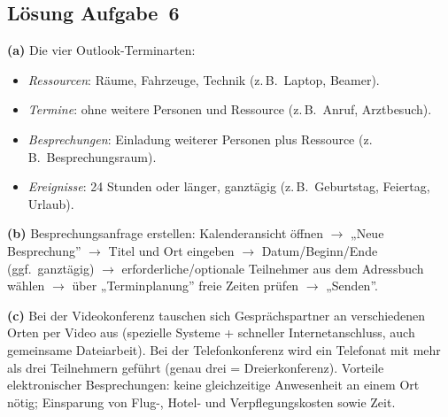 \documentclass[11pt, a4paper]{article}
\begin{document}
\subsection*{Lösung Aufgabe~6}
\begin{loesung}
\textbf{(a)} Die vier Outlook-Terminarten:
\begin{itemize}[itemsep=0pt]
  \item \emph{Ressourcen}: Räume, Fahrzeuge, Technik (z.\,B.\ Laptop, Beamer).
  \item \emph{Termine}: ohne weitere Personen und Ressource (z.\,B.\ Anruf, Arztbesuch).
  \item \emph{Besprechungen}: Einladung weiterer Personen plus Ressource (z.\,B.\ Besprechungsraum).
  \item \emph{Ereignisse}: 24 Stunden oder länger, ganztägig (z.\,B.\ Geburtstag, Feiertag, Urlaub).
\end{itemize}

\textbf{(b)} Besprechungsanfrage erstellen: Kalenderansicht öffnen $\rightarrow$ „Neue
Besprechung” $\rightarrow$ Titel und Ort eingeben $\rightarrow$ Datum/Beginn/Ende
(ggf.\ ganztägig) $\rightarrow$ erforderliche/optionale Teilnehmer aus dem Adressbuch
wählen $\rightarrow$ über „Terminplanung” freie Zeiten prüfen $\rightarrow$ „Senden”.

\textbf{(c)} Bei der Videokonferenz tauschen sich Gesprächspartner an verschiedenen
Orten per Video aus (spezielle Systeme + schneller Internetanschluss, auch gemeinsame
Dateiarbeit). Bei der Telefonkonferenz wird ein Telefonat mit mehr als drei Teilnehmern
geführt (genau drei = Dreierkonferenz). Vorteile elektronischer Besprechungen: keine
gleichzeitige Anwesenheit an einem Ort nötig; Einsparung von Flug-, Hotel- und
Verpflegungskosten sowie Zeit.
\end{loesung}
\end{document}
